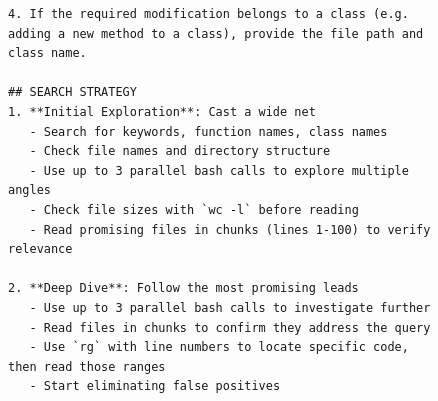 \begin{figure}[!h]
    \centering
\begin{tcolorbox}[colback=blue!6!white, colframe=blue!75!black, title=System Prompt for the OpenHands-Bash agent used by \methodname]
\begin{lstlisting}[basicstyle=\ttfamily\small, breaklines=true, columns=fullflexible]
4. If the required modification belongs to a class (e.g. adding a new method to a class), provide the file path and class name.

## SEARCH STRATEGY
1. **Initial Exploration**: Cast a wide net
   - Search for keywords, function names, class names
   - Check file names and directory structure
   - Use up to 3 parallel bash calls to explore multiple angles
   - Check file sizes with `wc -l` before reading
   - Read promising files in chunks (lines 1-100) to verify relevance

2. **Deep Dive**: Follow the most promising leads
   - Use up to 3 parallel bash calls to investigate further
   - Read files in chunks to confirm they address the query
   - Use `rg` with line numbers to locate specific code, then read those ranges
   - Start eliminating false positives


\end{lstlisting}
\end{tcolorbox}
\end{figure}
